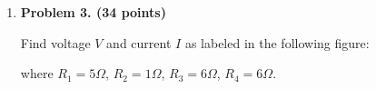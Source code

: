 \begin{enumerate}
\item {\bf Problem 3. (34 points)}

  Find voltage $V$ and current $I$ as labeled in the following figure:


  where $R_1=5\Omega$, $R_2=1\Omega$, $R_3=6\Omega$, $R_4=6\Omega$.

  \begin{comment}

  {\bf Solution:}

  {\bf Method 0, voltage/current source conversion:}
  \begin{itemize}
  \item Convert current source 9A and $R_2$ into a voltage source of $9\times 5=45V$
    in series with $R_1=5$. 
  \item Combine $R_1=5$ in series with $R_2=1$ to get $R'=6$ still in series with 
    $V'=45V$. 
  \item Convert this voltage source back to a current source with $I'=45/6$ in 
    parallel with $R'=6$. 
  \item Convert the other voltage source into a current source with $I''=24/6$ in
    parallel with $R''=6$.
  \item Combine the two parallel current sources to get $I'''=I'+I''=(45+24)/6=23/2$
    in parallel with $R'''=R'||R''=3$.
  \item Use current division to find load current $I=I'''/3=23/6$.
  \item Find load voltage $V=IR_4=23$.
  \end{itemize}

  {\bf Method 1, superposition:}
    \begin{itemize}
    \item Turn voltage source off:
      \[ I'=9\times\frac{5}{5+(1+6||6)}\frac{1}{2}=2.5A \]
      \[ V'=6I'=15 V \]
    \item Turn current source off:
      \[ I''=\frac{24}{6+(6||6)}\frac{1}{2}=4/3\;A \]
      \[ V''=6I''=8V \]
  \end{itemize}
  The total voltage and current are therefore $V=V''+V''=15+8=23V$,
  $I=I'+I''=23/6A$.

  {\bf Method 2, Thevenin's theorem:}
  
  \[ R_T=6||6=3 \]
  $V_T$ due to 24V:
  \[ V'_T=24-24 \frac{6}{12}=12V \]
  $V_T$ due to 9A:
  \[ V''_T=9\frac{5}{5+7}\times 6=22.5 \]
  Thererfore
  \[ V_T=V'_T+V''_T=34.5 \]
  Reconnecting load $R_4=6$, we get
  \[ V=V_T \frac{6}{6+3}=34.5\times 2/3=23 V \]
  and
  \[ I=V/R_4=23/6 \]

  \end{comment}

\end{enumerate}



